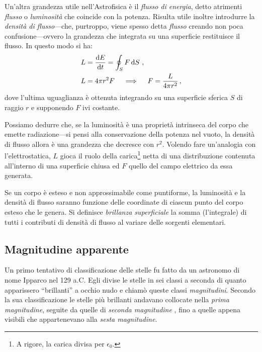     Un'altra grandezza utile nell'Astrofisica è il \emph{flusso di energia}, detto atrimenti \emph{flusso} o \emph{luminosità} che coincide con la potenza. Risulta utile inoltre introdurre la \emph{densità di flusso}---che, purtroppo, viene spesso detta \emph{flusso} creando non poca confusione---ovvero la grandezza che integrata su una superficie restituisce il flusso. In questo modo si ha:
    \begin{align}
        \label{eq:lumin-1}
        L &= \dv{E}{t} = \oint\nolimits_{S} F\dd{S} \,, \\
        \label{eq:lumin-2}
        L &= 4\pi r^2 F \quad \implies \quad F = \frac{L}{4\pi r^2}
        \,,
    \end{align}
    dove l'ultima uguaglianza è ottenuta integrando su una superficie sferica $S$ di raggio $r$ e supponendo $F$ ivi costante.

    Possiamo dedurre che, se la luminosità è una proprietà intrinseca del corpo che emette radiazione---si pensi alla conservazione della potenza nel vuoto, la densità di flusso allora è una grandezza che decresce con $r^2$. Volendo fare un'analogia con l'elettrostatica, $L$ gioca il ruolo della carica\footnote{A rigore, la carica divisa per $\epsilon_{0}$.} netta di una distribuzione contenuta all'interno di una superficie chiusa ed $F$ quello del campo elettrico da essa generata.

    Se un corpo è esteso e non approssimabile come puntiforme, la luminosità e la densità di flusso saranno funzione delle coordinate di ciascun punto del corpo esteso che le genera. Si definisce \emph{brillanza superficiale} la somma (l'integrale) di tutti i contributi di densità di flusso al variare delle sorgenti elementari.
    \subsection{Magnitudine apparente}
        Un primo tentativo di classificazione delle stelle fu fatto da un astronomo di nome Ipparco nel 129 a.C. Egli divise le stelle in sei classi a seconda di quanto apparissero ``brillanti'' a occhio nudo e chiamò queste classi \emph{magnitudini}. Secondo la sua classificazione le stelle più brillanti andavano collocate nella \emph{prima magnitudine}, seguite da quelle di \emph{seconda magnitudine} \myetc, fino a quelle appena visibili che appartenevano alla \emph{sesta magnitudine}.

